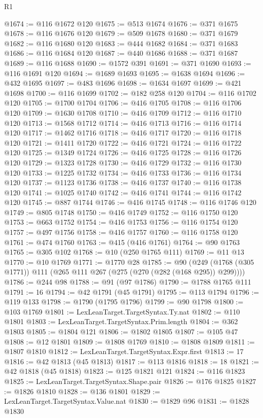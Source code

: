 \begin{lexlean}{R1}
\begin{coremodule}
@1674 := @116 @1672 @120
@1675 := @513 @1674
@1676 := @371 @1675
@1678 := @116 @1676 @120
@1679 := @509 @1678
@1680 := @371 @1679
@1682 := @116 @1680 @120
@1683 := @444 @1682
@1684 := @371 @1683
@1686 := @116 @1684 @120
@1687 := @440 @1686
@1688 := @371 @1687
@1689 := @116 @1688
@1690 := @1572 @391
@1691 := @371 @1690
@1693 := @116 @1691 @120
@1694 := @1689 @1693
@1695 := @1638 @1694
@1696 := @432 @1695
@1697 := @483 @1696
@1698 := @1634 @1697
@1699 := @421 @1698
@1700 := @116 @1699
@1702 := @182 @258 @120
@1704 := @116 @1702 @120
@1705 := @1700 @1704
@1706 := @416 @1705
@1708 := @116 @1706 @120
@1709 := @1630 @1708
@1710 := @416 @1709
@1712 := @116 @1710 @120
@1713 := @1568 @1712
@1714 := @416 @1713
@1716 := @116 @1714 @120
@1717 := @1462 @1716
@1718 := @416 @1717
@1720 := @116 @1718 @120
@1721 := @1411 @1720
@1722 := @416 @1721
@1724 := @116 @1722 @120
@1725 := @1349 @1724
@1726 := @416 @1725
@1728 := @116 @1726 @120
@1729 := @1323 @1728
@1730 := @416 @1729
@1732 := @116 @1730 @120
@1733 := @1225 @1732
@1734 := @416 @1733
@1736 := @116 @1734 @120
@1737 := @1123 @1736
@1738 := @416 @1737
@1740 := @116 @1738 @120
@1741 := @1025 @1740
@1742 := @416 @1741
@1744 := @116 @1742 @120
@1745 := @887 @1744
@1746 := @416 @1745
@1748 := @116 @1746 @120
@1749 := @805 @1748
@1750 := @416 @1749
@1752 := @116 @1750 @120
@1753 := @663 @1752
@1754 := @416 @1753
@1756 := @116 @1754 @120
@1757 := @497 @1756
@1758 := @416 @1757
@1760 := @116 @1758 @120
@1761 := @474 @1760
@1763 := @415 (@416 @1761)
@1764 := @90 @1763
@1765 := @305 @102
@1768 := @10 (@250 @1765 @111)
@1769 := @11 @13
@1770 := @10 @1769
@1771 := @1770 @28
@1785 := @90 (@249 (@1768 (@305 @1771)) @111 (@265 @111 @267 (@275 (@270 (@282 (@168 @295)) @299))))
@1786 := @244 @98
@1788 := @91 (@97 @1786)
@1790 := @1788 @1765 @111
@1791 := 16
@1794 := @42 @1791 (@45 @1791)
@1795 := @113 @1794
@1796 := @119 @133
@1798 := @1790 (@1795 @1796)
@1799 := @90 @1798
@1800 := @103 @1769
@1801 := LexLeanTarget.TargetSyntax.Ty.nat
@1802 := @110 @1801
@1803 := LexLeanTarget.TargetSyntax.Prim.length
@1804 := @362 @1803
@1805 := @1804 @121
@1806 := @1802 @1805
@1807 := @105 @47
@1808 := @12 @1801
@1809 := @1808 @1769
@1810 := @1808 @1809
@1811 := @1807 @1810
@1812 := LexLeanTarget.TargetSyntax.Expr.first
@1813 := 17
@1816 := @42 @1813 (@45 @1813)
@1817 := @113 @1816
@1818 := 18
@1821 := @42 @1818 (@45 @1818)
@1823 := @125 @1821 @121
@1824 := @116 @1823
@1825 := LexLeanTarget.TargetSyntax.Shape.pair
@1826 := @176 @1825
@1827 := @1826 @1810
@1828 := @136 @1801
@1829 := LexLeanTarget.TargetSyntax.Value.nat
@1830 := @1829 @96
@1831 := @1828 @1830

\end{coremodule}
\end{lexlean}
